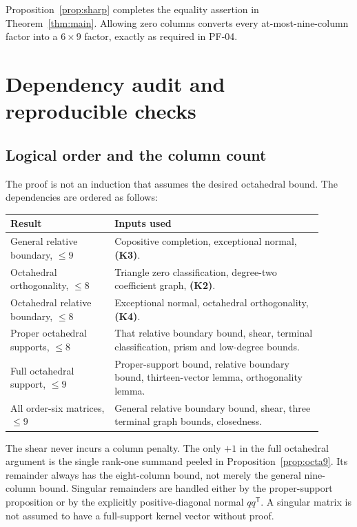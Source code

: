 \documentclass[11pt,a4paper]{article}
\theoremstyle{definition}
\newcommand{\T}{\mathsf T}
\newcommand{\inputfact}[1]{\textbf{(#1)}}
\begin{document}
Proposition~\ref{prop:sharp} completes the equality assertion in Theorem~\ref{thm:main}. Allowing zero columns converts every at-most-nine-column factor into a $6\times9$ factor, exactly as required in PF-04.

\section{Dependency audit and reproducible checks}

\subsection{Logical order and the column count}
The proof is not an induction that assumes the desired octahedral bound. The dependencies are ordered as follows:
\begin{center}
\begin{tabular}{@{}p{0.30\linewidth}p{0.60\linewidth}@{}}
\toprule
Result & Inputs used \\
\midrule
General relative boundary, $\leq9$ & Copositive completion, exceptional normal, \inputfact{K3}. \\
Octahedral orthogonality, $\leq8$ & Triangle zero classification, degree-two coefficient graph, \inputfact{K2}. \\
Octahedral relative boundary, $\leq8$ & Exceptional normal, octahedral orthogonality, \inputfact{K4}. \\
Proper octahedral supports, $\leq8$ & That relative boundary bound, shear, terminal classification, prism and low-degree bounds. \\
Full octahedral support, $\leq9$ & Proper-support bound, relative boundary bound, thirteen-vector lemma, orthogonality lemma. \\
All order-six matrices, $\leq9$ & General relative boundary bound, shear, three terminal graph bounds, closedness. \\
\bottomrule
\end{tabular}
\end{center}

The shear never incurs a column penalty. The only $+1$ in the full octahedral argument is the single rank-one summand peeled in Proposition~\ref{prop:octa9}. Its remainder always has the eight-column bound, not merely the general nine-column bound. Singular remainders are handled either by the proper-support proposition or by the explicitly positive-diagonal normal $qq^{\T}$. A singular matrix is not assumed to have a full-support kernel vector without proof.
\end{document}

